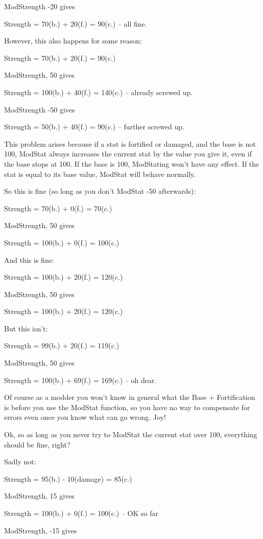 \documentclass[
]{article}
\begin{document}
ModStrength -20 gives

Strength = 70(b.) + 20(f.) = 90(c.) -- all fine.

However, this also happens for some reason:

Strength = 70(b.) + 20(f.) = 90(c.)

ModStrength, 50 gives

Strength = 100(b.) + 40(f.) = 140(c.) -- already screwed up.

ModStrength -50 gives

Strength = 50(b.) + 40(f.) = 90(c.) -- further screwed up.

This problem arises because if a stat is fortified or damaged, and the
base is not 100, ModStat always increases the current stat by the value
you give it, even if the base stops at 100. If the base is 100,
ModStating won't have any effect. If the stat is equal to its base
value, ModStat will behave normally.

So this is fine (so long as you don't ModStat -50 afterwards):

Strength = 70(b.) + 0(f.) = 70(c.)

ModStrength, 50 gives

Strength = 100(b.) + 0(f.) = 100(c.)

And this is fine:

Strength = 100(b.) + 20(f.) = 120(c.)

ModStrength, 50 gives

Strength = 100(b.) + 20(f.) = 120(c.)

But this isn't:

Strength = 99(b.) + 20(f.) = 119(c.)

ModStrength, 50 gives

Strength = 100(b.) + 69(f.) = 169(c.) -- oh dear.

Of course as a modder you won't know in general what the Base +
Fortification is before you use the ModStat function, so you have no way
to compensate for errors even once you know what can go wrong. Joy!

Ok, so as long as you never try to ModStat the current stat over 100,
everything should be fine, right?

Sadly not:

Strength = 95(b.) - 10(damage) = 85(c.)

ModStrength, 15 gives

Strength = 100(b.) + 0(f.) = 100(c.) -- OK so far

ModStrength, -15 gives
\end{document}
